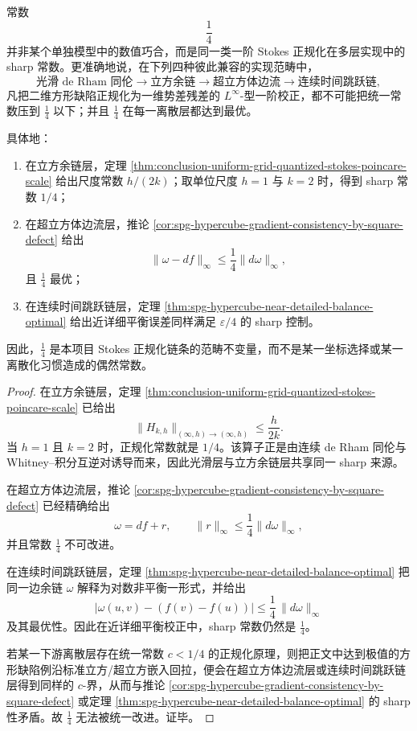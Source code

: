 \begin{theorem}\label{thm:conclusion-onequarter-cross-category-rigidity}
常数
\[
\frac14
\]
并非某个单独模型中的数值巧合，而是同一类一阶 Stokes 正规化在多层实现中的 sharp 常数。更准确地说，在下列四种彼此兼容的实现范畴中，
\[
\text{光滑 de Rham 同伦}
\longrightarrow
\text{立方余链}
\longrightarrow
\text{超立方体边流}
\longrightarrow
\text{连续时间跳跃链},
\]
凡把二维方形缺陷正规化为一维势差残差的 \(L^\infty\)-型一阶校正，都不可能把统一常数压到 \(\frac14\) 以下；并且 \(\frac14\) 在每一离散层都达到最优。

具体地：
\begin{enumerate}
  \item 在立方余链层，定理 \ref{thm:conclusion-uniform-grid-quantized-stokes-poincare-scale} 给出尺度常数 \(h/(2k)\)；取单位尺度 \(h=1\) 与 \(k=2\) 时，得到 sharp 常数 \(1/4\)；
  \item 在超立方体边流层，推论 \ref{cor:spg-hypercube-gradient-consistency-by-square-defect} 给出
  \[
  \|\omega-df\|_\infty\le \frac14\|d\omega\|_\infty,
  \]
  且 \(\frac14\) 最优；
  \item 在连续时间跳跃链层，定理 \ref{thm:spg-hypercube-near-detailed-balance-optimal} 给出近详细平衡误差同样满足 \(\varepsilon/4\) 的 sharp 控制。
\end{enumerate}
因此，\(\frac14\) 是本项目 Stokes 正规化链条的范畴不变量，而不是某一坐标选择或某一离散化习惯造成的偶然常数。
\end{theorem}
\begin{proof}
在立方余链层，定理 \ref{thm:conclusion-uniform-grid-quantized-stokes-poincare-scale} 已给出
\[
\|H_{k,h}\|_{(\infty,h)\to(\infty,h)}\le \frac{h}{2k}.
\]
当 \(h=1\) 且 \(k=2\) 时，正规化常数就是 \(1/4\)。该算子正是由连续 de Rham 同伦与 Whitney--积分互逆对诱导而来，因此光滑层与立方余链层共享同一 sharp 来源。

在超立方体边流层，推论 \ref{cor:spg-hypercube-gradient-consistency-by-square-defect} 已经精确给出
\[
\omega=df+r,
\qquad
\|r\|_\infty\le \frac14\|d\omega\|_\infty,
\]
并且常数 \(\frac14\) 不可改进。

在连续时间跳跃链层，定理 \ref{thm:spg-hypercube-near-detailed-balance-optimal} 把同一边余链 \(\omega\) 解释为对数非平衡一形式，并给出
\[
\bigl|\omega(u,v)-(f(v)-f(u))\bigr|\le \frac14\,\|d\omega\|_\infty
\]
及其最优性。因此在近详细平衡校正中，sharp 常数仍然是 \(\frac14\)。

若某一下游离散层存在统一常数 \(c<1/4\) 的正规化原理，则把正文中达到极值的方形缺陷例沿标准立方/超立方嵌入回拉，便会在超立方体边流层或连续时间跳跃链层得到同样的 \(c\)-界，从而与推论 \ref{cor:spg-hypercube-gradient-consistency-by-square-defect} 或定理 \ref{thm:spg-hypercube-near-detailed-balance-optimal} 的 sharp 性矛盾。故 \(\frac14\) 无法被统一改进。证毕。
\end{proof}

